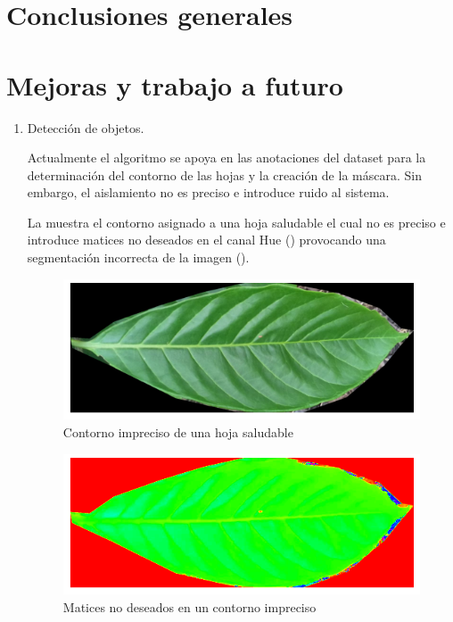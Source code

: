\section{Conclusiones generales}

\section{Mejoras y trabajo a futuro}

\begin{enumerate}

\item Detección de objetos.

Actualmente el algoritmo se apoya en las anotaciones del dataset para la determinación del contorno de las hojas y la creación de la máscara. Sin embargo, el aislamiento no es preciso e introduce ruido al sistema.

La  muestra el contorno asignado a una hoja saludable el cual no es preciso e introduce matices no deseados en el canal Hue () provocando una segmentación incorrecta de la imagen ().

\begin{figure}[H]
\centering
\includegraphics[scale=1]{images/consideration_contour_rgb.png}
\caption{Contorno impreciso de una hoja saludable}
\label{img:issue_countour_rgb}
\end{figure}

\begin{figure}[H]
\centering
\includegraphics[scale=1]{images/consideration_contour_hue.png}
\caption{Matices no deseados en un contorno impreciso}
\label{img:issue_countour_hue}
\end{figure}


\end{enumerate}

